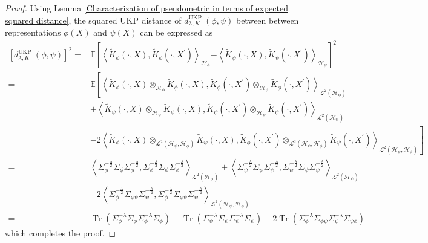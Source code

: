 \documentclass{article}
\theoremstyle{plain}
\newcommand{\E}{\mathbb{E}}
\newcommand{\HS}{\mathcal{L}^{2}}
\newcommand{\repone}{\phi}
\newcommand{\reptwo}{\psi}
\newcommand{\Hone}{\mathcal{H}_{\phi}}
\newcommand{\Htwo}{\mathcal{H}_{\psi}}
\newcommand{\inprod}[1]{\left \langle #1 \right\rangle}
\DeclareMathOperator*{\Tr}{\text{Tr}}
\newcommand{\metricstname}{UKP }
\begin{document}
\begin{proof}
    Using Lemma \ref{Characterization of pseudometric in terms of expected squared distance}, the squared \metricstname distance of $d_{\lambda,K}^{\text{\metricstname}}(\repone,\reptwo)$ between between representations $\repone(X)$ and $\reptwo(X)$ can be expressed as
    \[
    \begin{aligned}
        \left[d_{\lambda,K}^{\text{\metricstname}}(\repone,\reptwo)\right]^{2}
        =& \E\left[ \inprod{\widetilde{K}_{\repone}(\cdot,X),\widetilde{K}_{\repone}(\cdot,X^{\prime})}_{\Hone} \right.\left.-\inprod{\widetilde{K}_{\reptwo}(\cdot,X),\widetilde{K}_{\reptwo}(\cdot,X^{\prime})}_{\Htwo}\right]^{2}\\
        =& \E\left[\inprod{\widetilde{K}_{\repone}(\cdot,X)\otimes_{\Hone}\widetilde{K}_{\repone}(\cdot,X),\widetilde{K}_{\repone}(\cdot,X^{\prime})\otimes_{\Hone}\widetilde{K}_{\repone}(\cdot,X^{\prime})}_{\HS(\Hone)}\right.\\
        &\left.+\inprod{\widetilde{K}_{\reptwo}(\cdot,X)\otimes_{\Htwo}\widetilde{K}_{\reptwo}(\cdot,X),\widetilde{K}_{\reptwo}(\cdot,X^{\prime})\otimes_{\Htwo}\widetilde{K}_{\reptwo}(\cdot,X^{\prime})}_{\HS(\Htwo)}\right.\\
        &\left.-2\left\langle\widetilde{K}_{\repone}(\cdot,X)\otimes_{\HS(\Htwo,\Hone)}\widetilde{K}_{\reptwo}(\cdot,X),\right.\right.\left.\left.\widetilde{K}_{\repone}(\cdot,X^{\prime})\otimes_{\HS(\Htwo,\Hone)}\widetilde{K}_{\reptwo}(\cdot,X^{\prime})\right\rangle_{\HS(\Htwo,\Hone)}\right]\\
        =&\inprod{\Sigma_{\repone}^{-\frac{\lambda}{2}}\Sigma_{\repone}\Sigma_{\repone}^{-\frac{\lambda}{2}},\Sigma_{\repone}^{-\frac{\lambda}{2}}\Sigma_{\repone}\Sigma_{\repone}^{-\frac{\lambda}{2}}}_{\HS(\Hone)} + \inprod{\Sigma_{\reptwo}^{-\frac{\lambda}{2}}\Sigma_{\reptwo}\Sigma_{\reptwo}^{-\frac{\lambda}{2}},\Sigma_{\reptwo}^{-\frac{\lambda}{2}}\Sigma_{\reptwo}\Sigma_{\reptwo}^{-\frac{\lambda}{2}}}_{\HS(\Htwo)}\\
        &-2\inprod{\Sigma_{\repone}^{-\frac{\lambda}{2}} \Sigma_{\repone\reptwo} \Sigma_{\reptwo}^{-\frac{\lambda}{2}} ,\Sigma_{\repone}^{-\frac{\lambda}{2}} \Sigma_{\repone\reptwo} \Sigma_{\reptwo}^{-\frac{\lambda}{2}}}_{\HS(\Htwo,\Hone)}\\
        =& \Tr\left(\Sigma_{\repone}^{-\lambda}\Sigma_{\repone}\Sigma_{\repone}^{-\lambda}\Sigma_{\repone}\right) + \Tr\left(\Sigma_{\reptwo}^{-\lambda}\Sigma_{\reptwo}\Sigma_{\reptwo}^{-\lambda}\Sigma_{\reptwo}\right)-2\Tr\left(\Sigma_{\repone}^{-\lambda}\Sigma_{\repone\reptwo}\Sigma_{\reptwo}^{-\lambda}\Sigma_{\reptwo\repone}\right)
    \end{aligned}
    \]
    which completes the proof.
\end{proof}
\end{document}
